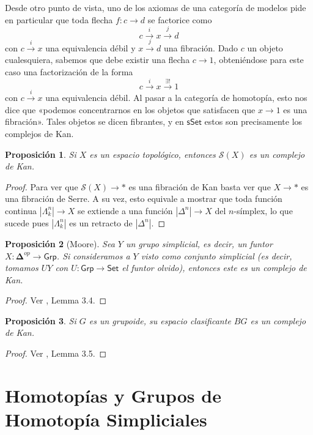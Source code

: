 \documentclass[11pt]{report}
\theoremstyle{colored}
\newtheorem{proposition}{Proposición}[section]
\newcommand{\cat}[1]{\mathsf{#1}}
\renewcommand{\ss}[1]{\Delta^{#1}}
\newcommand{\horn}[2]{\Lambda^{#1}_{#2}}
\newcommand{\ordcat}{\boldsymbol{\Delta}}
\newcommand{\guill}[1]{«#1»}
\begin{document}
Desde otro punto de vista, uno de los axiomas de una categoría de modelos pide en particular que toda flecha $f : c \to d$ se factorice como
\[
c \xrightarrow{i} x \xrightarrow{j} d
\]
con $c \xrightarrow{i} x$ una equivalencia débil y $x \xrightarrow{j} d$ una fibración. Dado $c$ un objeto cualesquiera, sabemos que debe existir una flecha $c \to 1$, obteniéndose para este caso una factorización de la forma
\[
c \xrightarrow{i} x \xrightarrow{\exists!} 1
\]
con $c \xrightarrow{i} x$ una equivalencia débil. Al pasar a la categoría de homotopía, esto nos dice que \guill{podemos concentrarnos en los objetos que satisfacen que $x \to 1$ es una fibración}. Tales objetos se dicen fibrantes, y en $\cat{sSet}$ estos son precisamente los complejos de Kan.

\begin{proposition} Si $X$ es un espacio topológico, entonces $\mathcal{S}(X)$ es un complejo de Kan. 
\end{proposition}
\begin{proof} Para ver que $\mathcal{S}(X) \to \ast$ es una fibración de Kan basta ver que $X \to \ast$ es una fibración de Serre. A su vez, esto equivale a mostrar que toda función continua $|\horn{n}{k}| \to X$ se extiende a una función $|\ss{n}| \to X$ del $n$-símplex, lo que sucede pues $|\horn{n}{k}|$ es un retracto de $|\ss{n}|$.
\end{proof}

\begin{proposition}[Moore] Sea $Y$ un grupo simplicial, es decir, un funtor $X : \ordcat^{op} \to \cat{Grp}$. Si consideramos a $Y$ visto como conjunto simplicial (es decir, tomamos $UY$ con $U : \cat{Grp} \to \cat{Set}$ el funtor olvido), entonces este es un complejo de Kan.
\end{proposition}
\begin{proof} Ver \cite{GJ}, Lemma 3.4.
\end{proof}

\begin{proposition} Si $G$ es un grupoide, su espacio clasificante $BG$ es un complejo de Kan.
\end{proposition}
\begin{proof} Ver \cite{GJ}, Lemma 3.5.
\end{proof}

\section{Homotopías y Grupos de Homotopía Simpliciales}
\end{document}
